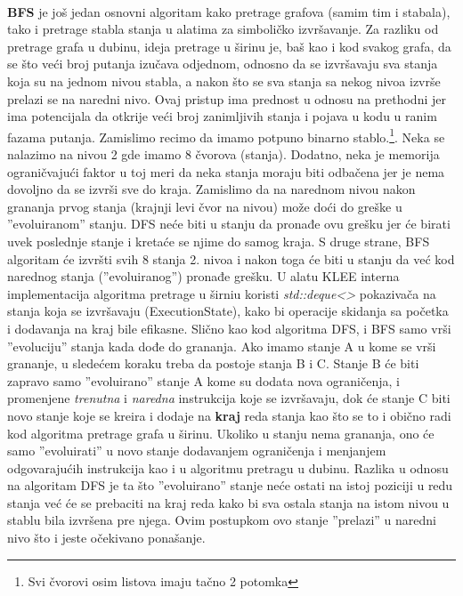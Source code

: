 \documentclass[12pt]{article}
\begin{document}
\\
\textbf{BFS} je još jedan osnovni algoritam kako pretrage grafova (samim tim i stabala), tako i pretrage stabla stanja u alatima za simboličko izvršavanje. Za razliku od pretrage grafa u dubinu, ideja pretrage u širinu je, baš kao i kod svakog grafa, da se što veći broj putanja izučava odjednom, odnosno da se izvršavaju sva stanja koja su na jednom nivou stabla, a nakon što se sva stanja sa nekog nivoa izvrše prelazi se na naredni nivo. Ovaj pristup ima prednost u odnosu na prethodni jer ima potencijala da otkrije veći broj zanimljivih stanja i pojava u kodu u ranim fazama putanja. Zamislimo recimo da imamo potpuno binarno stablo.\footnote[3]{Svi čvorovi osim listova imaju tačno 2 potomka}. Neka se nalazimo na nivou 2 gde imamo 8 čvorova (stanja). Dodatno, neka je memorija ograničvajući faktor u toj meri da neka stanja moraju biti odbačena jer je nema dovoljno da se izvrši sve do kraja. Zamislimo da na narednom nivou nakon grananja prvog stanja (krajnji levi čvor na nivou) može doći do greške u ''evoluiranom'' stanju. DFS neće biti u stanju da pronađe ovu grešku jer će birati uvek poslednje stanje i kretaće se njime do samog kraja. S druge strane, BFS algoritam će izvršti svih 8 stanja 2. nivoa i nakon toga će biti u stanju da već kod narednog stanja (''evoluiranog'') pronađe grešku. U alatu KLEE interna implementacija algoritma pretrage u širniu koristi \textit{std::deque<>} pokazivača na stanja koja se izvršavaju (ExecutionState), kako bi operacije skidanja sa početka i dodavanja na kraj bile efikasne. Slično kao kod algoritma DFS, i BFS samo vrši ''evoluciju'' stanja kada dođe do grananja. Ako imamo stanje A u kome se vrši grananje, u sledećem koraku treba da postoje stanja B i C. Stanje B će biti zapravo samo ''evoluirano'' stanje A kome su dodata nova ograničenja, i promenjene \textit{trenutna} i \textit{naredna} instrukcija koje se izvršavaju, dok će stanje C biti novo stanje koje se kreira i dodaje na \textbf{kraj} reda stanja kao što se to i obično radi kod algoritma pretrage grafa u širinu. Ukoliko u stanju nema grananja, ono će samo ''evoluirati'' u novo stanje dodavanjem ograničenja i menjanjem odgovarajućih instrukcija kao i u algoritmu pretragu u dubinu. Razlika u odnosu na algoritam DFS je ta što ''evoluirano'' stanje neće ostati na istoj poziciji u redu stanja već će se prebaciti na kraj reda kako bi sva ostala stanja na istom nivou u stablu bila izvršena pre njega. Ovim postupkom ovo stanje ''prelazi'' u naredni nivo što i jeste očekivano ponašanje. \newline
\end{document}
